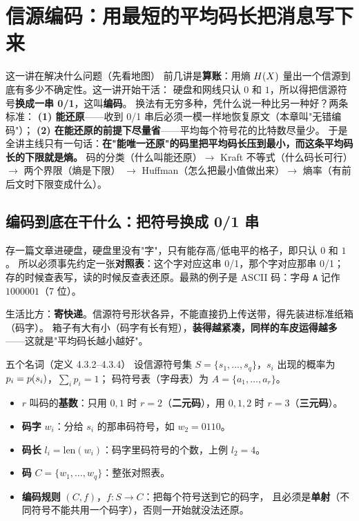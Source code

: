 \section{信源编码：用最短的平均码长把消息写下来}

\begin{idea}{这一讲在解决什么问题（先看地图）}
前几讲是\textbf{算账}：用熵 $H\!\left(X\right)$ 量出一个信源到底有多少不确定性。这一讲开始干活：
硬盘和网线只认 $0$ 和 $1$，所以得把信源符号\textbf{换成一串 0/1}，这叫\textbf{编码}。
换法有无穷多种，凭什么说一种比另一种好？两条标准：
\textbf{(1) 能还原}——收到 0/1 串后必须一模一样地恢复原文（本章叫"无错编码"）；
\textbf{(2) 在能还原的前提下尽量省}——平均每个符号花的比特数尽量少。
于是全讲主线只有一句话：\textbf{在"能唯一还原"的码里把平均码长压到最小，而这条平均码长的下限就是熵。}
码的分类（什么叫能还原）$\to$ Kraft 不等式（什么码长可行）$\to$ 两个界限（熵是下限）
$\to$ Huffman（怎么把最小值做出来）$\to$ 熵率（有前后文时下限变成什么）。
\end{idea}

\subsection{编码到底在干什么：把符号换成 0/1 串}

存一篇文章进硬盘，硬盘里没有"字"，只有能存高/低电平的格子，即只认 $0$ 和 $1$。
所以必须事先约定一张\textbf{对照表}：这个字对应这串 0/1，那个字对应那串 0/1；
存的时候查表写，读的时候反查表还原。最熟的例子是 ASCII 码：字母 \texttt{A} 记作 $1000001$（7 位）。

生活比方：\textbf{寄快递}。信源符号形状各异，不能直接扔上传送带，得先装进标准纸箱（码字）。
箱子有大有小（码字有长有短），\textbf{装得越紧凑，同样的车皮运得越多}——这就是"平均码长越小越好"。

\begin{defbox}{五个名词（定义 4.3.2--4.3.4）}
设信源符号集 $S=\{s_1,\dots,s_q\}$，$s_i$ 出现的概率为 $p_i=p\!\left(s_i\right)$，$\sum_i p_i=1$；
码符号表（字母表）为 $A=\{a_1,\dots,a_r\}$。
\begin{itemize}[leftmargin=1.3em,itemsep=1pt,topsep=2pt]
  \item $r$ 叫码的\textbf{基数}：只用 $0,1$ 时 $r=2$（\textbf{二元码}），用 $0,1,2$ 时 $r=3$（\textbf{三元码}）。
  \item \textbf{码字} $w_i$：分给 $s_i$ 的那串码符号，如 $w_2=0110$。
  \item \textbf{码长} $l_i=\mathrm{len}(w_i)$：码字里码符号的个数，上例 $l_2=4$。
  \item \textbf{码} $C=\{w_1,\dots,w_q\}$：整张对照表。
  \item \textbf{编码规则} $(C,f)$，$f:S\to C$：把每个符号送到它的码字，
        且必须是\textbf{单射}（不同符号不能共用一个码字），否则一开始就没法还原。
\end{itemize}
\end{defbox}

